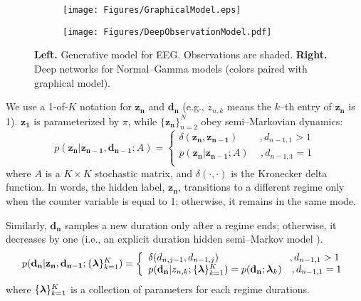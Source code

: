 \documentclass[runningheads]{llncs}
\begin{document}
\begin{figure}[tb]
	\centering
	\begin{subfigure}[t]{0.4793\linewidth}
\texttt{[image: Figures/GraphicalModel.eps]}
		\label{fig:GraphicalModel}
	\end{subfigure}
	\begin{subfigure}[t]{0.4793\linewidth}
\texttt{[image: Figures/DeepObservationModel.pdf]}
		\label{fig:DeepObservationModels}
	\end{subfigure}
	\caption{\textbf{Left.} Generative model for EEG. Observations are shaded. \textbf{Right.} Deep networks for Normal--Gamma models (colors paired with graphical model).}
	\label{fig:DNDBN}
\end{figure}


We use a 1-of-$K$ notation for $\mathbf{z_n}$ and $\mathbf{d_n}$ (e.g., $z_{n,k}$ means the $k$--th entry of $\mathbf{z_n}$ is 1). $\mathbf{z_1}$ is parameterized by \boldmath$\pi$\unboldmath, while $\{\mathbf{z_{n}}\}_{n=2}^N$ obey semi--Markovian dynamics:
\begin{equation}
p(\mathbf{z_n}|\mathbf{z_{n-1}},\mathbf{d_{n-1}}; A) =
\left\{
\begin{array}{ll}
\delta(\mathbf{z_n},\mathbf{z_{n-1}}) \qquad \, ,d_{n-1,1} > 1   \\
p(\mathbf{z_n}|\mathbf{z_{n-1}}; A) \quad \, ,d_{n-1,1} = 1\\
\end{array}
\right.
\label{eq:zState}
\end{equation}
where $A$ is a $K \times K$ stochastic matrix, and $\delta(\cdot,\cdot)$ is the Kronecker delta function. In words, the hidden label, $\mathbf{z_n}$, transitions to a different regime only when the counter variable is equal to 1; otherwise, it remains in the same mode. 

Similarly, $\mathbf{d_n}$ samples a new duration only after a regime ends; otherwise, it decreases by one (i.e., an explicit duration hidden semi--Markov model \cite{ferguson1980variable,yu2010hidden}).
\begin{equation}
p(\mathbf{d_n}|\mathbf{z_n},\mathbf{d_{n-1}}; \{\text{\boldmath$\lambda$\unboldmath}\}_{k=1}^K )=
\left\{
\begin{array}{ll}
\delta(d_{n,j-1},d_{n-1,j}) \qquad \qquad \qquad \quad \, ,d_{n-1,1} > 1   \\
p(\mathbf{d_n}|z_{n,k}; \{\text{\boldmath$\lambda$\unboldmath}\}_{k=1}^K) = p(\mathbf{d_n};\text{\boldmath$\lambda$\unboldmath}_k) \quad ,d_{n-1,1} = 1\\
\end{array}
\right.
\label{eq:dState}
\end{equation}
where $\{\text{\boldmath$\lambda$\unboldmath}\}_{k=1}^K $ is a collection of parameters for each regime durations.
\end{document}
